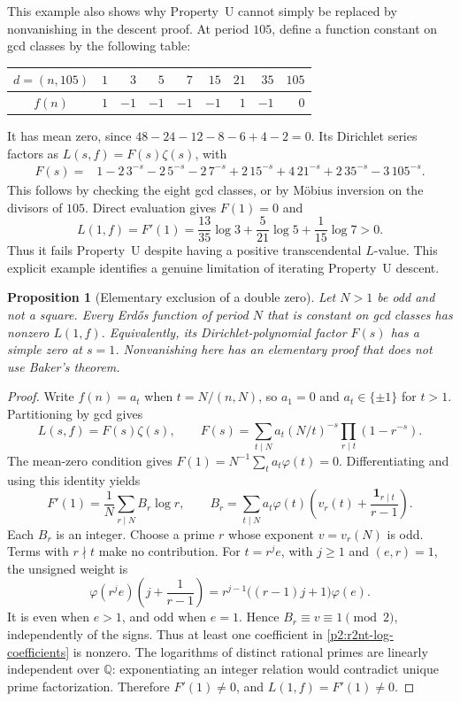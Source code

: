 \documentclass[11pt,a4paper]{article}
\newtheorem{proposition}[theorem]{Proposition}
\theoremstyle{definition}
\theoremstyle{remark}
\numberwithin{equation}{section}
\begin{document}
This example also shows why Property~U cannot simply be replaced
by nonvanishing in the descent proof.  At period $105$, define a
function constant on gcd
classes by the following table:
\begin{center}
\begin{tabular}{c|rrrrrrrr}
$d=(n,105)$ & $1$ & $3$ & $5$ & $7$ & $15$ & $21$ & $35$ & $105$\\\hline
$f(n)$ & $1$ & $-1$ & $-1$ & $-1$ & $-1$ & $1$ & $-1$ & $0$
\end{tabular}
\end{center}
It has mean zero, since
$48-24-12-8-6+4-2=0$.  Its Dirichlet series factors as
$L(s,f)=F(s)\zeta(s)$, with
\begin{align*}
 F(s)={}&1-2\,3^{-s}-2\,5^{-s}-2\,7^{-s}
       +2\,15^{-s}+4\,21^{-s}+2\,35^{-s}-3\,105^{-s}.
\end{align*}
This follows by checking the eight gcd classes, or by M\"obius
inversion on the divisors of $105$.  Direct evaluation gives
$F(1)=0$ and
\begin{equation}
\label{p2:r2nt-u-counterexample}
 L(1,f)=F'(1)=\frac{13}{35}\log3+
        \frac5{21}\log5+\frac1{15}\log7>0.
\end{equation}
Thus it fails Property~U despite having a positive transcendental
$L$-value.  This explicit example identifies a genuine limitation
of iterating Property~U descent.

\begin{proposition}[Elementary exclusion of a double zero]
\label{p2:r2nt-gcd-invariant}
Let $N>1$ be odd and not a square.  Every Erd\H{o}s function of
period $N$ that is constant on gcd classes has nonzero $L(1,f)$.
Equivalently, its Dirichlet-polynomial factor $F(s)$ has a simple
zero at $s=1$.  Nonvanishing here has an elementary proof that
does not use Baker's theorem.
\end{proposition}
\begin{proof}
Write $f(n)=a_t$ when $t=N/(n,N)$, so $a_1=0$ and
$a_t\in\{\pm1\}$ for $t>1$.  Partitioning by gcd gives
\[
 L(s,f)=F(s)\zeta(s),\qquad
 F(s)=\sum_{t\mid N}a_t(N/t)^{-s}
                         \prod_{r\mid t}(1-r^{-s}).
\]
The mean-zero condition gives $F(1)=N^{-1}\sum_ta_t\varphi(t)=0$.
Differentiating and using this identity yields
\begin{equation}
\label{p2:r2nt-log-coefficients}
 F'(1)=\frac1N\sum_{r\mid N}B_r\log r,\qquad
 B_r=\sum_{t\mid N}a_t\varphi(t)
       \left(v_r(t)+\frac{\mathbf1_{r\mid t}}{r-1}\right).
\end{equation}
Each $B_r$ is an integer.  Choose a prime $r$ whose exponent
$v=v_r(N)$ is odd.  Terms with $r\nmid t$ make no contribution.
For $t=r^je$, with $j\ge1$ and $(e,r)=1$, the unsigned weight is
\[
 \varphi(r^je)\left(j+\frac1{r-1}\right)
 =r^{j-1}\bigl((r-1)j+1\bigr)\varphi(e).
\]
It is even when $e>1$, and odd when $e=1$.  Hence
$B_r\equiv v\equiv1\pmod2$, independently of the signs.
Thus at least one coefficient in \eqref{p2:r2nt-log-coefficients}
is nonzero.  The logarithms of distinct rational primes are
linearly independent over $\mathbb Q$: exponentiating an integer
relation would contradict unique prime factorization.  Therefore
$F'(1)\ne0$, and $L(1,f)=F'(1)\ne0$.
\end{proof}
\end{document}
